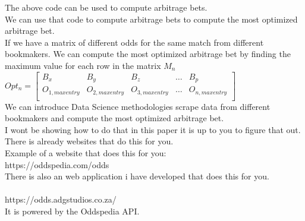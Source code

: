 The above code can be used to compute arbitrage bets.\\

We can use that code to compute arbitrage bets to compute the most optimized arbitrage bet.\\

If we have a matrix of different odds for the same match from different bookmakers. We can compute the most optimized arbitrage bet by finding the maximum value for each row in the matrix $M_{n}$ \\

\begin{math}
    Opt_{n} = \begin{bmatrix}
        B_{x} & B_{y} & B_{z} & \dots & B_{p} \\
        O_{1,maxentry} & O_{2,maxentry} & O_{3,maxentry} & \dots & O_{n,maxentry} \\
    \end{bmatrix}
\end{math} \\

We can introduce Data Science methodologies scrape data from different bookmakers and compute the most optimized arbitrage bet.\\
I wont be showing how to do that in this paper it is up to you to figure that out.\\

There is already websites that do this for you.\\

Example of a website that does this for you: \\ https://oddspedia.com/odds \\

There is also an web application i have developed that does this for you.\\
\\ https://odds.adgstudios.co.za/ \\

It is powered by the Oddspedia API.\\

